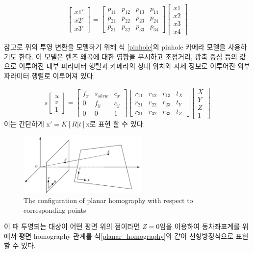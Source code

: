 \documentclass[master,korean,final]{cbnu-ecs}
\begin{document}
\begin{equation}
\begin{bmatrix} x1'\\x2'\\x3' \end{bmatrix} = \begin{bmatrix} p_{11} & p_{12} & p_{13} & p_{14} \\ p_{21} & p_{22} & p_{23} & p_{24}\\ p_{31} & p_{32} & p_{33} & p_{34} \end{bmatrix}\begin{bmatrix} x1\\x2\\x3\\x4 \end{bmatrix} \label{homography}
\end{equation}

참고로 위의 투영 변환을 모델하기 위해 식 \eqref{pinhole}의 pinhole 카메라 모델을 사용하기도 한다. 이 모델은 렌즈 왜곡에 대한 영향을 무시하고 초점거리, 광축 중심 등의 값으로 이루어진 내부 파라미터 행렬과 카메라의 상대 위치와 자세 정보로 이루어진 외부 파라미터 행렬로 이루어져 있다.

\begin{equation}
s\begin{bmatrix} u\\v\\1 \end{bmatrix} = \begin{bmatrix} f_{x} & s_{skew} & c_{x} \\ 0 & f_{y} & c_{y} \\ 0 & 0 & 1 \end{bmatrix}\begin{bmatrix} r_{11} & r_{12} & r_{13} & t_{X} \\ r_{21} & r_{22} & r_{23} & t_{Y}\\ r_{31} & r_{32} & r_{33} & t_{Z} \end{bmatrix}\begin{bmatrix} X\\Y\\Z\\1 \end{bmatrix} \label{pinhole}
\end{equation}
이는 간단하게 $\mathrm{x}'=K[R|t]\mathrm{x}$로 표현 할 수 있다.
\begin{figure}[!ht]
  \centering
	\includegraphics[width=240px]{img/planar_homography_cropped.pdf}
  \caption{The configuration of planar homography with respect to corresponding points }
\label{planar_homography}
\end{figure}
이 때 투영되는 대상이 어떤 평면 위의 점이라면 $Z=0$임을 이용하여 동차좌표계를 위에서 평면 homography 관계를 식\eqref{planar_homography}와 같이 선형방정식으로 표현할 수 있다.
\end{document}
